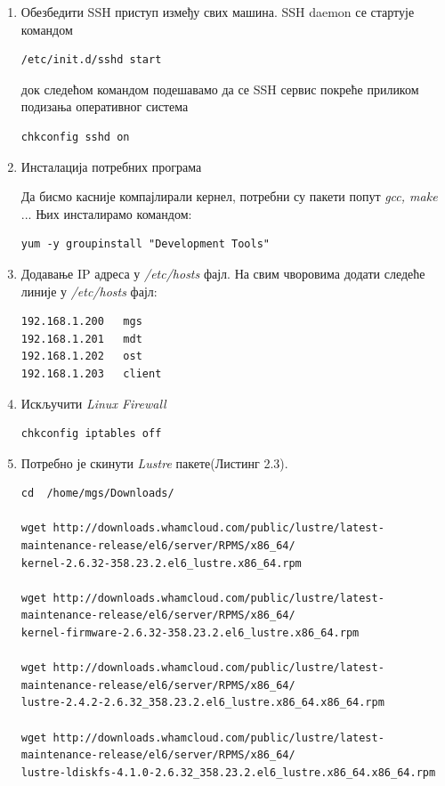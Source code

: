 \begin{enumerate}
\item  Обезбедити SSH приступ између свих машина. 
SSH daemon се стартује командом
\begin{verbatim}
/etc/init.d/sshd start
\end{verbatim}
док следећом командом подешавамо да се  SSH сервис покреће приликом подизања оперативног система
\begin{verbatim}
chkconfig sshd on
\end{verbatim}

\item Инсталација потребних програма

Да бисмо касније компајлирали кернел, потребни су пакети попут \textit{gcc, make} ... Њих инсталирамо командом:

\begin{verbatim}
yum -y groupinstall "Development Tools"
\end{verbatim}

\item Додавање  IP адреса у \textit{/etc/hosts} фајл. На свим чворовима додати следеће линије у \textit{/etc/hosts} фајл:
\begin{verbatim}
192.168.1.200   mgs
192.168.1.201   mdt
192.168.1.202   ost
192.168.1.203   client
\end{verbatim}

\item  Искључити  \textit{Linux Firewall}
\begin{verbatim}
chkconfig iptables off
\end{verbatim}

\item Потребно је скинути    \textit{Lustre} пакете(Листинг 2.3).
\begin{lstlisting}[style=nonumbers,frame=single, caption= \textit{Lustre} пакетi]
cd  /home/mgs/Downloads/

wget http://downloads.whamcloud.com/public/lustre/latest-maintenance-release/el6/server/RPMS/x86_64/
kernel-2.6.32-358.23.2.el6_lustre.x86_64.rpm

wget http://downloads.whamcloud.com/public/lustre/latest-maintenance-release/el6/server/RPMS/x86_64/
kernel-firmware-2.6.32-358.23.2.el6_lustre.x86_64.rpm

wget http://downloads.whamcloud.com/public/lustre/latest-maintenance-release/el6/server/RPMS/x86_64/
lustre-2.4.2-2.6.32_358.23.2.el6_lustre.x86_64.x86_64.rpm

wget http://downloads.whamcloud.com/public/lustre/latest-maintenance-release/el6/server/RPMS/x86_64/
lustre-ldiskfs-4.1.0-2.6.32_358.23.2.el6_lustre.x86_64.x86_64.rpm


\end{lstlisting}
\end{enumerate}
